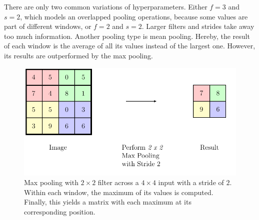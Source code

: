 There are only two common variations of hyperparameters.
Either $f=3$ and $s=2$, which models an overlapped pooling operations, because some values are part of different windows, or $f=2$ and $s=2$.
Larger filters and strides take away too much information.
Another pooling type is mean pooling.
Hereby, the result of each window is the average of all its values instead of the largest one.
However, its results are outperformed by the max pooling\cite{Scherer2010}.
\begin{figure}
	\centering
	\includegraphics{images/pooling.pdf}
	\caption[Max pooling with $2 \times 2$ filter and stride $2$]{Max pooling with $2 \times 2$ filter across a $4 \times 4$ input with a stride of $2$. Within each window, the maximum of its values is computed. Finally, this yields a matrix with each maximum at its corresponding position.}
	\label{fig:pooling}
\end{figure}